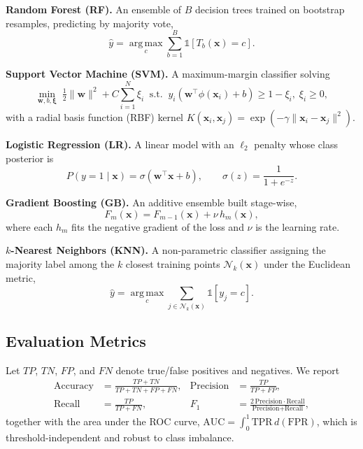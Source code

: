 \documentclass[conference]{IEEEtran}
\begin{document}
\textbf{Random Forest (RF).} An ensemble of $B$ decision trees trained on bootstrap resamples,
predicting by majority vote,
\begin{equation}
\hat{y}=\operatorname*{arg\,max}_{c}\sum_{b=1}^{B}\mathbb{1}\!\left[T_b(\mathbf{x})=c\right].
\end{equation}

\textbf{Support Vector Machine (SVM).} A maximum-margin classifier solving
\begin{equation}
\min_{\mathbf{w},b,\boldsymbol{\xi}}\; \tfrac{1}{2}\lVert\mathbf{w}\rVert^{2}+C\sum_{i=1}^{N}\xi_i
\;\; \text{s.t.}\;\; y_i(\mathbf{w}^{\top}\phi(\mathbf{x}_i)+b)\geq 1-\xi_i,\; \xi_i\geq 0,
\end{equation}
with a radial basis function (RBF) kernel
$K(\mathbf{x}_i,\mathbf{x}_j)=\exp(-\gamma\lVert\mathbf{x}_i-\mathbf{x}_j\rVert^{2})$.

\textbf{Logistic Regression (LR).} A linear model with an $\ell_2$ penalty whose class posterior is
\begin{equation}
P(y=1\mid\mathbf{x})=\sigma(\mathbf{w}^{\top}\mathbf{x}+b),\qquad \sigma(z)=\frac{1}{1+e^{-z}}.
\end{equation}

\textbf{Gradient Boosting (GB).} An additive ensemble built stage-wise,
\begin{equation}
F_m(\mathbf{x})=F_{m-1}(\mathbf{x})+\nu\,h_m(\mathbf{x}),
\end{equation}
where each $h_m$ fits the negative gradient of the loss and $\nu$ is the learning rate.

\textbf{$k$-Nearest Neighbors (KNN).} A non-parametric classifier assigning the majority label
among the $k$ closest training points $\mathcal{N}_k(\mathbf{x})$ under the Euclidean metric,
\begin{equation}
\hat{y}=\operatorname*{arg\,max}_{c}\sum_{j\in\mathcal{N}_k(\mathbf{x})}\mathbb{1}\!\left[y_j=c\right].
\end{equation}

\subsection{Evaluation Metrics}
Let $TP$, $TN$, $FP$, and $FN$ denote true/false positives and negatives. We report
\begin{align}
\text{Accuracy}&=\frac{TP+TN}{TP+TN+FP+FN}, &
\text{Precision}&=\frac{TP}{TP+FP},\\
\text{Recall}&=\frac{TP}{TP+FN}, &
F_1&=\frac{2\,\text{Precision}\cdot\text{Recall}}{\text{Precision}+\text{Recall}},
\end{align}
together with the area under the ROC curve,
$\text{AUC}=\int_{0}^{1}\text{TPR}\,d(\text{FPR})$, which is threshold-independent and
robust to class imbalance.
\end{document}
